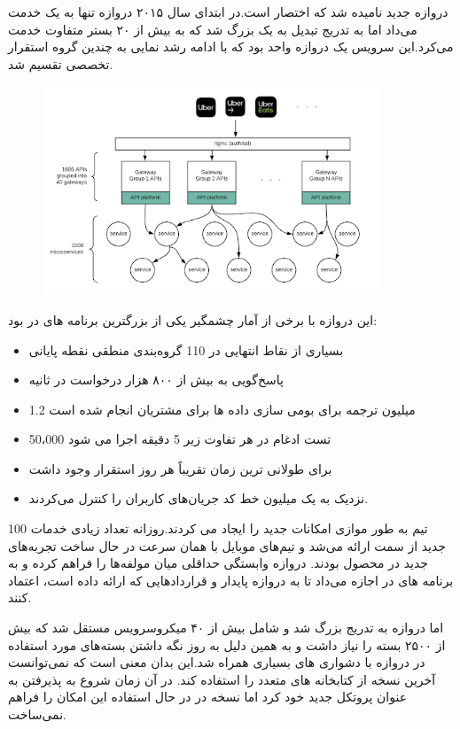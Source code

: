 دروازه جدید  نامیده شد که اختصار  است.در ابتدای سال ۲۰۱۵ دروازه تنها به یک  خدمت می‌داد اما به تدریج تبدیل به یک  بزرگ شد که به بیش از ۲۰ بستر متفاوت خدمت می‌کرد.این سرویس یک دروازه واحد بود که با ادامه رشد نمایی به چندین گروه استقرار تخصصی تقسیم شد.
\begin{figure}[h]
\label{fig:apigateway_gen2}
\centering
\includegraphics[width=10cm]{gen2_apigateway.png}
\end{figure}

این دروازه با برخی از آمار چشمگیر یکی از بزرگترین برنامه های  در  بود:
\begin{itemize}
\item
بسیاری از نقاط انتهایی در 110 گروه‌بندی منطقی نقطه پایانی
\item
پاسخ‌گویی به بیش از ۸۰۰ هزار درخواست در ثانیه
\item
1.2 میلیون ترجمه برای بومی سازی داده ها برای مشتریان انجام شده است
\item
50،000 تست ادغام در هر تفاوت زیر 5 دقیقه اجرا می شود
\item
برای طولانی ترین زمان تقریباً هر روز استقرار وجود داشت
\item
نزدیک به یک میلیون خط کد جریان‌های کاربران را کنترل می‌کردند.
\end{itemize}

100 تیم به طور موازی امکانات جدید را ایجاد می کردند.روزانه تعداد زیادی خدمات جدید از سمت  ارائه می‌شد و تیم‌های موبایل با همان سرعت در حال ساخت تجربه‌های جدید در محصول بودند. دروازه وابستگی حداقلی میان مولفه‌ها را فراهم کرده و به برنامه های در  اجازه می‌داد تا به دروازه  پایدار و قراردادهایی که ارائه داده است، اعتماد کنند.

اما دروازه به تدریج بزرگ شد و شامل بیش از ۴۰ میکروسرویس مستقل شد که بیش از ۲۵۰۰ بسته  را نیاز داشت و به همین دلیل به روز نگه داشتن بسته‌های مورد استفاده در دروازه با دشواری های بسیاری همراه شد.این بدان معنی است که  نمی‌توانست آخرین نسخه از کتابخانه های متعدد را استفاده کند. در آن زمان  شروع به پذیرفتن  به عنوان پروتکل جدید خود کرد اما نسخه    در در حال استفاده این امکان را فراهم نمی‌ساخت.

